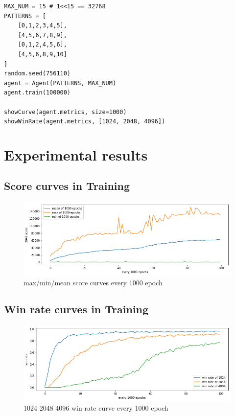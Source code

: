 \documentclass[12pt]{article}
\begin{document}
\begin{verbatim}
MAX_NUM = 15 # 1<<15 == 32768
PATTERNS = [
    [0,1,2,3,4,5],
    [4,5,6,7,8,9],
    [0,1,2,4,5,6],
    [4,5,6,8,9,10]
]
random.seed(756110)
agent = Agent(PATTERNS, MAX_NUM)
agent.train(100000)

showCurve(agent.metrics, size=1000)
showWinRate(agent.metrics, [1024, 2048, 4096])
\end{verbatim}

\section{Experimental results}

\subsection{Score curves in Training}

\begin{figure}[H]
\centering
\includegraphics[width=\linewidth]{Images/scorecurve.png}
\caption{max/min/mean score curves every 1000 epoch}
\end{figure}

\subsection{Win rate curves in Training}

\begin{figure}[H]
\centering
\includegraphics[width=\linewidth]{Images/winratecurve.png} 
\caption{1024 2048 4096 win rate curve every 1000 epoch}
\end{figure}
\end{document}
